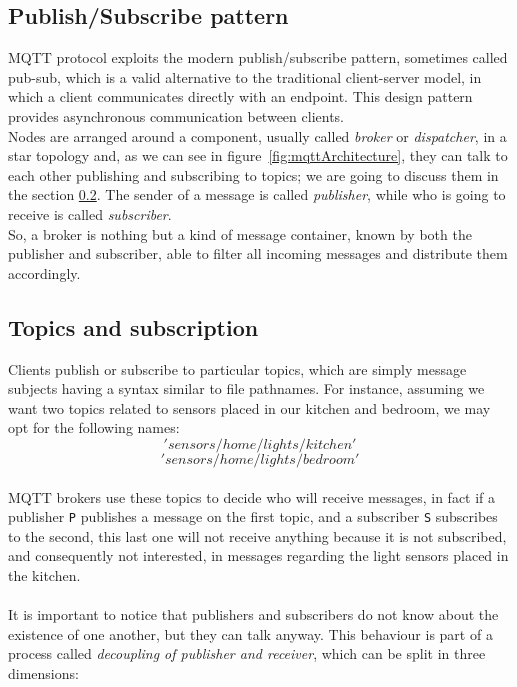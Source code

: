 \documentclass[12pt]{report}
\begin{document}
{\bigskip
\subsection{Publish/Subscribe pattern}
\label{ssec:pubsubpattern}
\bigskip
MQTT protocol exploits the modern publish/subscribe pattern, sometimes called pub-sub, which is a valid alternative to the traditional client-server model, in which a client communicates directly with an endpoint.
This design pattern provides asynchronous communication between clients.\\
Nodes are arranged around a component, usually called \emph{broker} or \emph{dispatcher}, in a star topology and, as we can see in figure~\ref{fig:mqttArchitecture}, they can talk to each other publishing and subscribing to topics; we are going to discuss them in the section \ref{ssec:topicsandsub}.
The sender of a message is called \emph{publisher}, while who is going to receive is called \emph{subscriber}.\\
So, a broker is nothing but a kind of message container, known by both the publisher and subscriber, able to filter all incoming messages and distribute them accordingly.\\

\subsection{Topics and subscription}
\label{ssec:topicsandsub}
\bigskip
Clients publish or subscribe to particular topics, which are simply message subjects having a syntax similar to file pathnames. For instance, assuming we want two topics related to sensors placed in our kitchen and bedroom, we may opt for the following names: $$'sensors/home/lights/kitchen'$$ $$'sensors/home/lights/bedroom'$$\\
MQTT brokers use these topics to decide who will receive messages, in fact if a publisher \texttt{P} publishes a message on the first topic, and a subscriber \texttt{S} subscribes to the second, this last one will not receive anything because it is not subscribed, and consequently not interested, in messages regarding the light sensors placed in the kitchen.\\\\ 
It is important to notice that publishers and subscribers do not know about the existence of one another, but they can talk anyway.
This behaviour is part of a process called \emph{decoupling of publisher and receiver}, which can be split in three dimensions:

}
\end{document}
